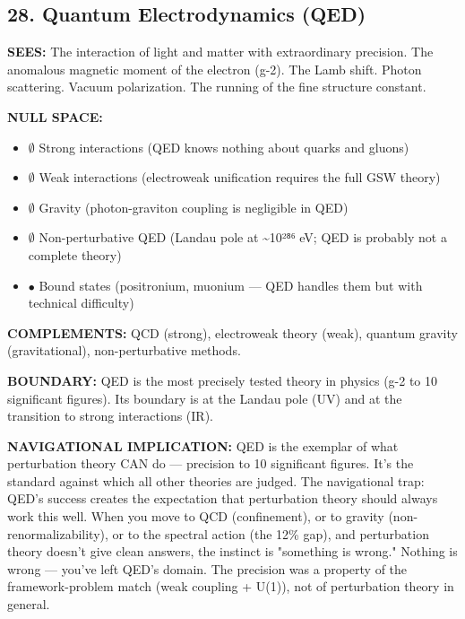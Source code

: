 \bigskip\noindent\makebox[\textwidth]{\color{rulegray}\rule{5cm}{0.3pt}}\bigskip


\subsection*{28. Quantum Electrodynamics (QED)}


\textbf{SEES:} The interaction of light and matter with extraordinary precision. The anomalous magnetic moment of the electron (g-2). The Lamb shift. Photon scattering. Vacuum polarization. The running of the fine structure constant.


\textbf{NULL SPACE:}

\begin{itemize}[nosep,leftmargin=*]
  \item $\emptyset$ Strong interactions (QED knows nothing about quarks and gluons)
  \item $\emptyset$ Weak interactions (electroweak unification requires the full GSW theory)
  \item $\emptyset$ Gravity (photon-graviton coupling is negligible in QED)
  \item $\emptyset$ Non-perturbative QED (Landau pole at \textasciitilde{}10²⁸⁶ eV; QED is probably not a complete theory)
  \item $\bullet$ Bound states (positronium, muonium — QED handles them but with technical difficulty)
\end{itemize}


\textbf{COMPLEMENTS:} QCD (strong), electroweak theory (weak), quantum gravity (gravitational), non-perturbative methods.


\textbf{BOUNDARY:} QED is the most precisely tested theory in physics (g-2 to 10 significant figures). Its boundary is at the Landau pole (UV) and at the transition to strong interactions (IR).


\textbf{NAVIGATIONAL IMPLICATION:} QED is the exemplar of what perturbation theory CAN do — precision to 10 significant figures. It's the standard against which all other theories are judged. The navigational trap: QED's success creates the expectation that perturbation theory should always work this well. When you move to QCD (confinement), or to gravity (non-renormalizability), or to the spectral action (the 12\% gap), and perturbation theory doesn't give clean answers, the instinct is "something is wrong." Nothing is wrong — you've left QED's domain. The precision was a property of the framework-problem match (weak coupling + U(1)), not of perturbation theory in general.


